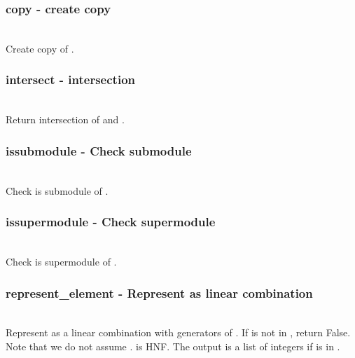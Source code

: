   \subsubsection{copy - create copy}
   \\
   \spacing
   \quad Create copy of .\\
   \spacing
  \subsubsection{intersect - intersection}
   \\
   \spacing
   \quad Return intersection of  and .\\
   \spacing
  \subsubsection{issubmodule - Check submodule}
   \\
   \spacing
   \quad Check  is submodule of .\\
   \spacing
  \subsubsection{issupermodule - Check supermodule}
   \\
   \spacing
   \quad Check  is supermodule of .\\
   \spacing
  \subsubsection{represent\_element - Represent as linear combination}
   \\
   \spacing
   \quad Represent  as a linear combination with generators of .
        If  is not in , return False.\\
   \spacing
   \quad Note that we do not assume . is HNF.
   \spacing
   \quad
   The output is a list of integers if  is in .\\
   \spacing
